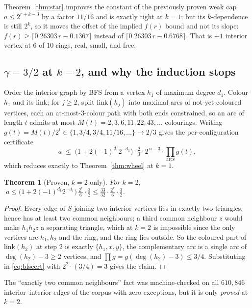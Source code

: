 \documentclass[11pt]{article}
\newtheorem{theorem}{Theorem}[section]
\theoremstyle{definition}
\begin{document}
Theorem~\ref{thm:star} improves the constant of the previously proven weak cap
$a \le 2^{r+k-3}$ by a factor $11/16$ and is exactly tight at $k=1$; but its
$k$-dependence is still $2^k$, so it moves the offset of the implied $f(r)$ bound and
not its slope: $f(r) \ge \lceil 0.26303\,r - 0.1367\rceil$ instead of
$\lceil 0.26303\,r - 0.6768\rceil$. That is $+1$ interior vertex at $6$ of $10$
rings, real, small, and free.

\subsection{$\gamma = 3/2$ at $k = 2$, and why the induction stops}

Order the interior graph by BFS from a vertex $h_1$ of maximum degree $d_1$. Colour
$h_1$ and its link; for $j\ge2$, split $\mathrm{link}(h_j)$ into maximal arcs of
not-yet-coloured vertices, each an at-most-$3$-colour path with both ends constrained,
so an arc of length $t$ admits at most $M(t) = 2,3,6,11,22,43,\dots$ colourings.
Writing $g(t)=M(t)/2^t \in \{1, 3/4, 3/4, 11/16, \dots\} \to 2/3$ gives the
per-configuration certificate
\begin{equation}
\label{eq:bfscert}
  a \;\le\; \bigl(1 + 2(-1)^{d_1}2^{-d_1}\bigr)\cdot\tfrac{2}{3}\cdot 2^{\,n-3}
      \cdot \textstyle\prod_{\text{arcs}} g(t),
\end{equation}
which reduces exactly to Theorem~\ref{thm:wheel} at $k=1$.

\begin{theorem}[Proven, $k=2$ only]
\label{thm:gamma32}
For $k=2$,
$\;a \le \bigl(1+2(-1)^{d_1}2^{-d_1}\bigr)\,\frac{2^r}{6}\cdot\frac{3}{2}
      \le \frac{33}{32}\cdot\frac{2^r}{6}\cdot\frac{3}{2}$.
\end{theorem}

\begin{proof}
Every edge of $S$ joining two interior vertices lies in exactly two triangles, hence
has at least two common neighbours; a third common neighbour $z$ would make
$h_1h_2z$ a separating triangle, which at $k=2$ is impossible since the only vertices
are $h_1,h_2$ and the ring, and the ring lies outside. So the coloured part of
$\mathrm{link}(h_2)$ at step $2$ is exactly $\{h_1,x,y\}$, the complementary arc is a
single arc of $\deg(h_2)-3 \ge 2$ vertices, and $\prod g = g(\deg(h_2)-3) \le 3/4$.
Substituting in \eqref{eq:bfscert} with $2^2\cdot(3/4)=3$ gives the claim.
\end{proof}

The ``exactly two common neighbours'' fact was machine-checked on all $610{,}846$
interior--interior edges of the corpus with zero exceptions, but it is only
\emph{proved} at $k=2$.
\end{document}
